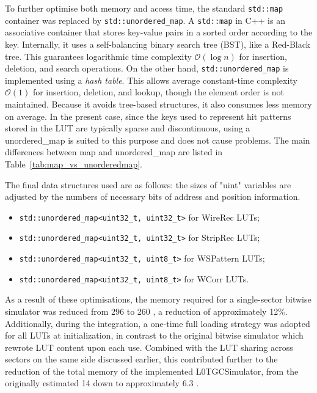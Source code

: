 To further optimise both memory and access time, the standard \texttt{std::map} container was replaced by \texttt{std::unordered\_map}. A \texttt{std::map} in C++ is an associative container that stores key-value pairs in a sorted order according to the key. Internally, it uses a self-balancing binary search tree (BST), like a Red-Black tree. This guarantees logarithmic time complexity $\mathcal{O}(\log n)$ for insertion, deletion, and search operations. On the other hand, \texttt{std::unordered\_map} is implemented using a \textit{hash table}. This allows average constant-time complexity $\mathcal{O}(1)$ for insertion, deletion, and lookup, though the element order is not maintained. Because it avoids tree-based structures, it also consumes less memory on average. In the present case, since the keys used to represent hit patterns stored in the LUT are typically sparse and discontinuous, using a unordered\_map is suited to this purpose and does not cause problems. The main differences between map and unordered\_map are listed in Table~\ref{tab:map_vs_unorderedmap}.


The final data structures used are as follows: the sizes of "uint" variables are adjusted by the numbers of necessary bits of address and position information.
\begin{itemize}
  \item \texttt{std::unordered\_map<uint32\_t, uint32\_t>} for WireRec LUTs;
  \item \texttt{std::unordered\_map<uint32\_t, uint32\_t>} for StripRec LUTs;
  \item \texttt{std::unordered\_map<uint32\_t, uint8\_t>}  for WSPattern LUTs;
  \item \texttt{std::unordered\_map<uint32\_t, uint8\_t>}  for WCorr LUTs.
\end{itemize}

As a result of these optimisations, the memory required for a single-sector bitwise simulator was reduced from 296  to 260 , a reduction of approximately 12\%. Additionally, during the integration, a one-time full loading strategy was adopted for all LUTs at initialization, in contrast to the original bitwise simulator which rewrote LUT content upon each use. Combined with the LUT sharing across sectors on the same side discussed earlier, this contributed further to the reduction of the total memory of the implemented L0TGCSimulator, from the originally estimated 14  down to approximately 6.3 .
